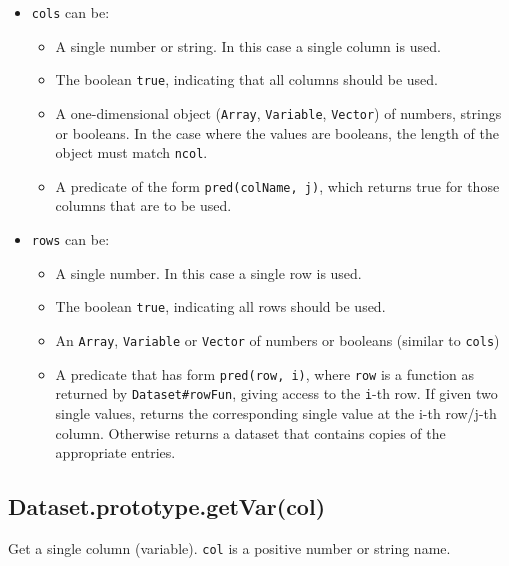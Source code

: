 \documentclass{article}
\begin{document}
\begin{itemize}

\item \texttt{cols} can be:\begin{itemize}

\item A single number or string. In this case a single column is used.

\item The boolean \texttt{true}, indicating that all columns should be used.

\item A one-dimensional object (\texttt{Array}, \texttt{Variable}, \texttt{Vector}) of numbers, strings
or booleans. In the case where the values are booleans, the length of the
object must match \texttt{ncol}.

\item A predicate of the form \texttt{pred(colName, j)}, which returns true for
those columns that are to be used.

\end{itemize}



\item \texttt{rows} can be:\begin{itemize}

\item A single number. In this case a single row is used.

\item The boolean \texttt{true}, indicating all rows should be used.

\item An \texttt{Array}, \texttt{Variable} or \texttt{Vector} of numbers or booleans (similar to \texttt{cols})

\item A predicate that has form \texttt{pred(row, i)}, where \texttt{row} is a function as returned
by \texttt{Dataset\#rowFun}, giving access to the \texttt{i}-th row.
If given two single values, returns the corresponding single value at the
i-th row/j-th column. Otherwise returns a dataset that contains copies of the
appropriate entries.

\end{itemize}



\end{itemize}

    \subsection{Dataset.prototype.getVar(col)}
    Get a single column (variable). \texttt{col} is a positive number or string name.
\end{document}
